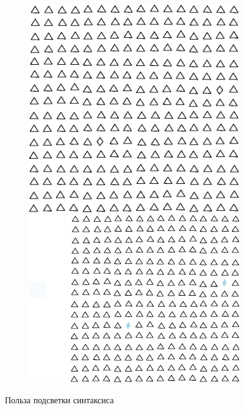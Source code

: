 \documentclass[14pt, openany]{report}
\begin{document}
\begin{figure}[h]
  \centering
  \begin{subfigure}{\linewidth}
    \includegraphics[scale=0.8]{uncolored}\hfill
    \includegraphics[scale=0.8]{colored}
  \end{subfigure}
  \label{fig:highlighting}
  \caption{Польза подсветки синтаксиса}
\end{figure}
\end{document}
